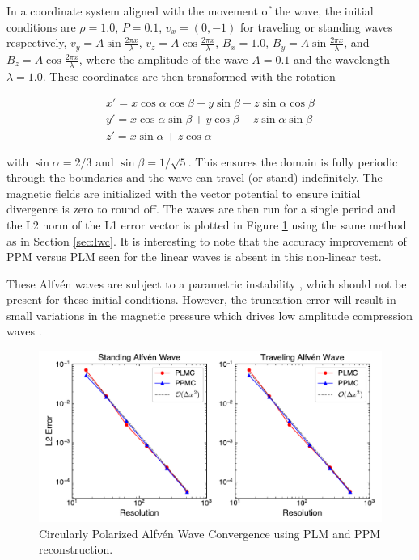 \documentclass[modern, linenumbers]{aastex631}
\newcommand*{\img}[1]{%
    \raisebox{-.05\baselineskip}{%
        \texttt{[image: \#1]}%
    }%
}
\begin{document}
In a coordinate system aligned with the movement of the wave, the initial conditions are
$\rho = 1.0$,
$P = 0.1$,
$v_x = (0,-1)$ for traveling or standing waves respectively,
$v_y = A \sin{\frac{2\pi x}{\lambda}}$,
$v_z = A \cos{\frac{2\pi x}{\lambda}}$,
$B_x = 1.0$,
$B_y = A \sin{\frac{2\pi x}{\lambda}}$,
and $B_z = A \cos{\frac{2\pi x}{\lambda}}$,
where the amplitude of the wave $A = 0.1$ and the wavelength $\lambda = 1.0$. These coordinates are then transformed with the rotation

\begin{eqnarray}
    x\prime = x \cos\alpha\cos\beta - y \sin\beta - z \sin\alpha\cos\beta \nonumber \\
    y\prime = x \cos\alpha\sin\beta + y \cos\beta - z \sin\alpha\sin\beta \nonumber \\
    z\prime = x \sin\alpha + z \cos\alpha \nonumber
\end{eqnarray}

\noindent with $\sin\alpha = 2/3$ and $\sin\beta = 1/\sqrt{5}$. This ensures the domain is fully periodic through the boundaries and the wave can travel (or stand) indefinitely. The magnetic fields are initialized with the vector potential to ensure initial divergence is zero to round off. The waves are then run for a single period and the L2 norm of the L1 error vector is plotted in Figure \ref{fig:cpaw} using the same method as in Section \ref{sec:lwc}. It is interesting to note that the accuracy improvement of PPM versus PLM seen for the linear waves is absent in this non-linear test.

These Alfv\'en waves are subject to a parametric instability \citep{del_zanna_parametric_2001}, which should not be present for these initial conditions. However, the truncation error will result in small variations in the magnetic pressure which drives low amplitude compression waves \citep{stone_athena_2008}.

\begin{figure}[ht!]
    \includegraphics[width=\linewidth]{cpaw_convergence.pdf}
    \caption{Circularly Polarized Alfv\'en Wave Convergence using PLM and PPM reconstruction. \href{https://zenodo.org/records/10927223}{\img{zenodo-gradient-200.png}}}
    \label{fig:cpaw}
\end{figure}
\end{document}
